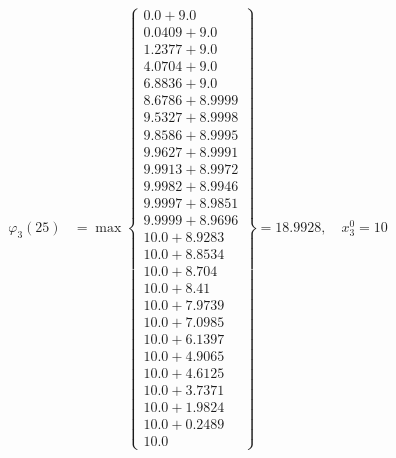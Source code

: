 \documentclass{article}
\begin{document}
\begin{align*}
\varphi_{3}(25) &= \max \left\{ \begin{array}{c}
0.0 + 9.0 \\
 0.0409 + 9.0 \\
 1.2377 + 9.0 \\
 4.0704 + 9.0 \\
 6.8836 + 9.0 \\
 8.6786 + 8.9999 \\
 9.5327 + 8.9998 \\
 9.8586 + 8.9995 \\
 9.9627 + 8.9991 \\
 9.9913 + 8.9972 \\
 9.9982 + 8.9946 \\
 9.9997 + 8.9851 \\
 9.9999 + 8.9696 \\
 10.0 + 8.9283 \\
 10.0 + 8.8534 \\
 10.0 + 8.704 \\
 10.0 + 8.41 \\
 10.0 + 7.9739 \\
 10.0 + 7.0985 \\
 10.0 + 6.1397 \\
 10.0 + 4.9065 \\
 10.0 + 4.6125 \\
 10.0 + 3.7371 \\
 10.0 + 1.9824 \\
 10.0 + 0.2489 \\
 10.0
\end{array} \right\}=18.9928, \quad x_{3}^0=10\\
  

\end{align*}
\end{document}
